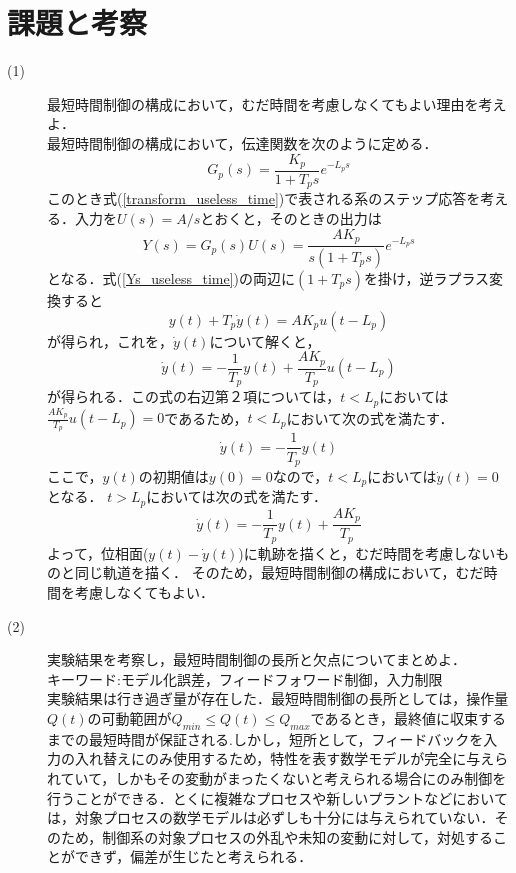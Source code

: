 \documentclass[12pt]{jsarticle}
\begin{document}
\section{課題と考察}
\begin{description}
\item[(1)]最短時間制御の構成において，むだ時間を考慮しなくてもよい理由を考えよ．\\
最短時間制御の構成において，伝達関数を次のように定める．
\begin{equation}
  \label{transform_useless_time}
  G_p(s) = \frac{K_p}{1+T_ps} e^{-L_ps}
\end{equation}
このとき式(\ref{transform_useless_time})で表される系のステップ応答を考える．入力を$U(s)=A/s$とおくと，そのときの出力は
\begin{equation}
  \label{Ys_useless_time}
  Y(s) = G_p(s)U(s) = \frac{AK_p}{s(1+T_ps)} e^{-L_ps}
\end{equation}
となる．式(\ref{Ys_useless_time})の両辺に$(1+T_ps)$を掛け，逆ラプラス変換すると
\begin{equation}
  y(t) + T_p\dot{y}(t) = AK_pu(t-L_p)
\end{equation}
が得られ，これを，$\dot{y}(t)$について解くと，
\begin{equation}
  \dot{y}(t) = -\frac{1}{T_p}y(t) + \frac{AK_p}{T_p}u(t-L_p)
\end{equation}
が得られる．この式の右辺第２項については，$t < L_p$においては$\frac{AK_p}{T_p}u(t-L_p)=0$であるため，$t < L_p$において次の式を満たす．
\begin{equation}
  \dot{y}(t) = -\frac{1}{T_p}y(t)
\end{equation}
ここで，$y(t)$の初期値は$y(0)=0$なので，$t < L_p$においては$\dot{y}(t)=0$となる．
$t > L_p$においては次の式を満たす．
\begin{equation}
  \dot{y}(t) = -\frac{1}{T_p}y(t) + \frac{AK_p}{T_p}
\end{equation}
よって，位相面($y(t) - \dot{y}(t)$)に軌跡を描くと，むだ時間を考慮しないものと同じ軌道を描く．
そのため，最短時間制御の構成において，むだ時間を考慮しなくてもよい．
\item[(2)]実験結果を考察し，最短時間制御の長所と欠点についてまとめよ．\\
キーワード:モデル化誤差，フィードフォワード制御，入力制限\\
  実験結果は行き過ぎ量が存在した．最短時間制御の長所としては，操作量$Q(t)$の可動範囲が$Q_{min} \leq Q(t) \leq Q_{max}$であるとき，最終値に収束するまでの最短時間が保証される\cite{process_control}.しかし，短所として，フィードバックを入力の入れ替えにのみ使用するため，特性を表す数学モデルが完全に与えられていて，しかもその変動がまったくないと考えられる場合にのみ制御を行うことができる．とくに複雑なプロセスや新しいプラントなどにおいては，対象プロセスの数学モデルは必ずしも十分には与えられていない\cite{optimal_controll_theory}．そのため，制御系の対象プロセスの外乱や未知の変動に対して，対処することができず，偏差が生じたと考えられる．
\end{description}
\end{document}
